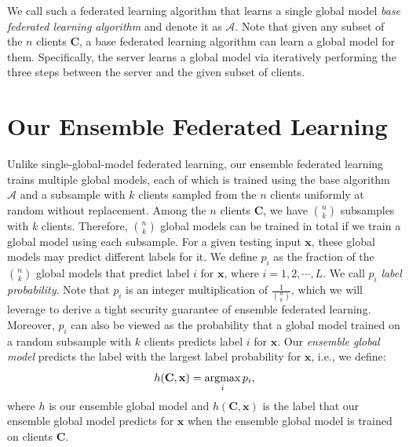 \documentclass[letterpaper]{article} %
\newcommand{\argmax}{\operatornamewithlimits{argmax}}
\begin{document}
We call such a federated learning algorithm that learns a single global model  \emph{base federated learning algorithm} and denote it as $\mathcal{A}$. Note that given any subset of the $n$ clients $\mathbf{C}$, a base federated learning algorithm can learn a global model for them. Specifically, the server learns a global model via iteratively performing the three steps between the server and the given subset of clients.


\section{Our Ensemble Federated Learning}

Unlike single-global-model federated learning, our ensemble federated learning trains multiple global models, each of which is trained using the base algorithm $\mathcal{A}$ and a subsample with $k$ clients sampled from the $n$ clients uniformly at random without replacement. Among the $n$ clients $\mathbf{C}$, we have ${n \choose k}$ subsamples with $k$ clients. Therefore,   ${n \choose k}$ global models can be trained in total if we train a global model using each subsample. For a given testing input $\mathbf{x}$, these global models may predict different labels for it. We define $p_i$ as the fraction of the ${n \choose k}$ global models that predict label $i$ for $\mathbf{x}$, where $i=1,2,\cdots, L$. We call $p_i$ \emph{label probability}. Note that $p_i$ is an integer multiplication of  $\frac{1}{{n \choose k}}$, which we will leverage to derive a tight security guarantee of ensemble federated learning. Moreover, $p_i$ can also be viewed as the probability that a global model trained on a random subsample with $k$ clients predicts label $i$ for $\mathbf{x}$.
 Our \emph{ensemble global model} predicts the label with the largest label probability for $\mathbf{x}$, i.e., we define:
\begin{equation}
    h(\mathbf{C},\mathbf{x}) = \argmax_i p_i,
    \label{eq:define_k}
\end{equation}
where $h$ is our {ensemble global model} and $h(\mathbf{C}, \mathbf{x})$ is the label that our {ensemble global model} predicts for $\mathbf{x}$ when the ensemble global model is trained on clients $\mathbf{C}$.
\end{document}
